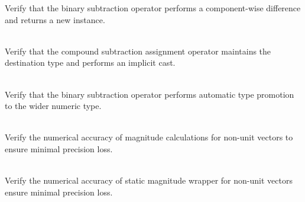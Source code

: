 \begin{DoxyRefList}
\label{test__test000021}%
%
Verify that the binary subtraction operator performs a component-\/wise difference and returns a new  instance.  
\item[{\parbox[t]{\linewidth}{Member \doxylink{group___f_g_m___vec4___subtraction_ga3214a5bebb22fd262d81d48c175c5c92}{Vector4\+DSubtraction\+\_\+\+Mixed\+Type\+Subtraction\+Assignment\+Does\+Not\+Promote\+Type} ()}}]\hfill \\
\label{test__test000024}%
%
Verify that the compound subtraction assignment operator maintains the destination type and performs an implicit cast.  
\item[{\parbox[t]{\linewidth}{Member \doxylink{group___f_g_m___vec4___subtraction_ga9819b6ebbb4132ac25f6e111c22f5208}{Vector4\+DSubtraction\+\_\+\+Mixed\+Type\+Subtraction\+Promotes\+Type} ()}}]\hfill \\
\label{test__test000023}%
%
Verify that the binary subtraction operator performs automatic type promotion to the wider numeric type.  
\item[{\parbox[t]{\linewidth}{Member \doxylink{_magnitude_tests_8cpp_a93f5aefd504e25dc166f5f24ebb1c394}{Vector4\+DUnclean\+Magnitude\+\_\+\+Non\+Unit\+Vector\+Returns\+Correct\+Magnitude\+With\+Minimal\+Precision\+Loss} ()}}]\hfill \\
\label{test__test000113}%
%
Verify the numerical accuracy of  magnitude calculations for non-\/unit vectors to ensure minimal precision loss.  
\item[{\parbox[t]{\linewidth}{Member \doxylink{_magnitude_tests_8cpp_a645fd14ddd6529df29b538e3df6c7834}{Vector4\+DUnclean\+Magnitude\+\_\+\+Static\+Wrapper\+\_\+\+Non\+Unit\+Vector\+Returns\+Correct\+Magnitude\+With\+Minimal\+Precision\+Loss} ()}}]\hfill \\
\label{test__test000114}%
%
Verify the numerical accuracy of  static magnitude wrapper for non-\/unit vectors ensure minimal precision loss. 
\end{DoxyRefList}